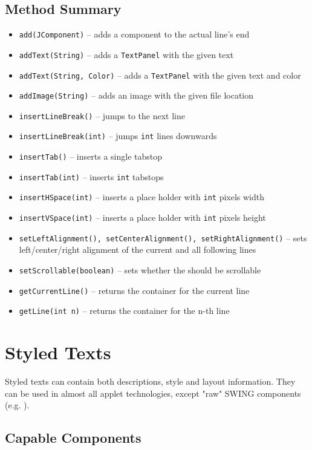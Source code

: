 \subsection{Method Summary}
  \begin{itemize}
    \item \verb|add(JComponent)| -- adds a component to the actual line's end
    \item \verb|addText(String)| -- adds a {\tt TextPanel} with the given text
    \item \verb|addText(String, Color)| -- adds a {\tt TextPanel} with the given text and color
    \item \verb|addImage(String)| -- adds an image with the given file location
    \item \verb|insertLineBreak()| -- jumps to the next line
    \item \verb|insertLineBreak(int)| -- jumps \verb|int| lines downwards
    \item \verb|insertTab()| -- inserts a single tabstop
    \item \verb|insertTab(int)| -- inserts \verb|int| tabstops
    \item \verb|insertHSpace(int)| -- inserts a place holder with \verb|int| pixels width
    \item \verb|insertVSpace(int)| -- inserts a place holder with \verb|int| pixels height
    \item \verb|setLeftAlignment(), setCenterAlignment(), setRightAlignment()| -- sets left/center/right 
          alignment of the current and all following lines
    \item \verb|setScrollable(boolean)| -- sets whether the \cp should be scrollable
    \item \verb|getCurrentLine()| -- returns the container for the current line
    \item \verb|getLine(int n)| -- returns the container for the n-th line
  \end{itemize}



\newpage
\section{Styled Texts}

Styled texts can contain both descriptions, style and layout information.
They can be used in almost all applet technologies, except "raw" SWING components (e.g. ).

\subsection{Capable Components}

